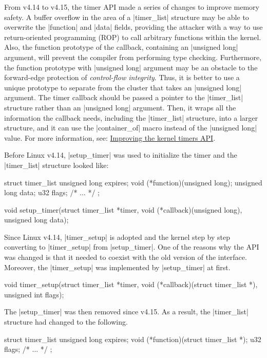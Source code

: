 \documentclass[10pt, oneside]{book}
\begin{document}
From v4.14 to v4.15, the timer API made a series of changes to improve memory safety.
A buffer overflow in the area of a \cpp|timer_list| structure may be able to overwrite the \cpp|function| and \cpp|data| fields, providing the attacker with a way to use return-oriented programming (ROP) to call arbitrary functions within the kernel.
Also, the function prototype of the callback, containing an \cpp|unsigned long| argument, will prevent the compiler from performing type checking.
Furthermore, the function prototype with \cpp|unsigned long| argument may be an obstacle to the forward-edge protection of \textit{control-flow integrity}.
Thus, it is better to use a unique prototype to separate from the cluster that takes an \cpp|unsigned long| argument.
The timer callback should be passed a pointer to the \cpp|timer_list| structure rather than an \cpp|unsigned long| argument.
Then, it wraps all the information the callback needs, including the \cpp|timer_list| structure, into a larger structure, and it can use the \cpp|container_of| macro instead of the \cpp|unsigned long| value.
For more information, see: \href{https://lwn.net/Articles/735887/}{Improving the kernel timers API}.

Before Linux v4.14, \cpp|setup_timer| was used to initialize the timer and the \cpp|timer_list| structure looked like:
\begin{code}
struct timer_list {
    unsigned long expires;
    void (*function)(unsigned long);
    unsigned long data;
    u32 flags;
    /* ... */
};

void setup_timer(struct timer_list *timer, void (*callback)(unsigned long),
                 unsigned long data);
\end{code}

Since Linux v4.14, \cpp|timer_setup| is adopted and the kernel step by step converting to \cpp|timer_setup| from \cpp|setup_timer|.
One of the reasons why the API was changed is that it needed to coexist with the old version of the interface.
Moreover, the \cpp|timer_setup| was implemented by \cpp|setup_timer| at first.
\begin{code}
void timer_setup(struct timer_list *timer,
                 void (*callback)(struct timer_list *), unsigned int flags);
\end{code}

The \cpp|setup_timer| was then removed since v4.15.
As a result, the \cpp|timer_list| structure had changed to the following.
\begin{code}
struct timer_list {
    unsigned long expires;
    void (*function)(struct timer_list *);
    u32 flags;
    /* ... */
};
\end{code}
\end{document}
